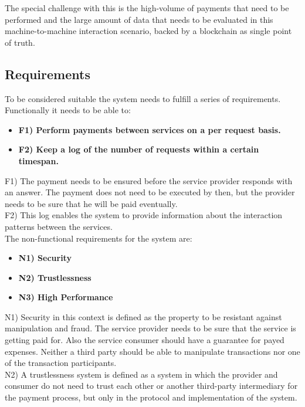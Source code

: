 \documentclass[a4paper,12pt]{scrartcl}
\begin{document}
The special challenge with this is the high-volume of payments that need to be performed and the large amount of data that needs to be evaluated in this machine-to-machine interaction scenario, backed by a blockchain as single point of truth.

\subsection{Requirements}

To be considered suitable the system needs to fulfill a series of requirements.\\

Functionally it needs to be able to:

\begin{itemize}
\item[] \textbf{F1) Perform payments between services on a per request basis.}
\item[] \textbf{F2) Keep a log of the number of requests within a certain timespan.}
\end{itemize}

F1) The payment needs to be ensured before the service provider responds with an answer. The payment does not need to be executed by then, but the provider needs to be sure that he will be paid eventually.\\

F2) This log enables the system to provide information about the interaction patterns between the services.\\

The non-functional requirements for the system are:

\begin{itemize}
\item[] \textbf{N1) Security}
\item[] \textbf{N2) Trustlessness}
\item[] \textbf{N3) High Performance}
\end{itemize}

N1) Security in this context is defined as the property to be resistant against manipulation and fraud. The service provider needs to be sure that the service is getting paid for. Also the service consumer should have a guarantee for payed expenses . Neither a third party should be able to manipulate transactions nor one of the transaction participants.\\

N2) A trustlessness system is defined as a system in which the provider and consumer do not need to trust each other or another third-party intermediary for the payment process, but only in the protocol and implementation of the system.\\
\end{document}
